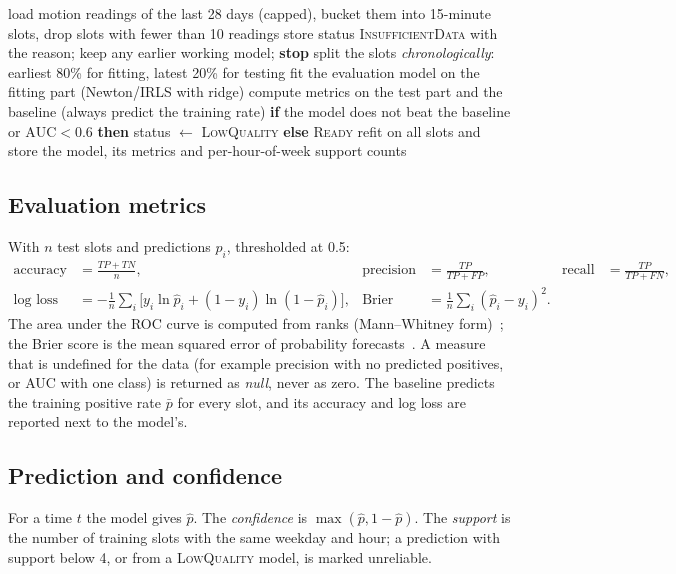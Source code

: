 \documentclass[12pt,a4paper,oneside]{report}
\begin{document}
\begin{algorithm}[H]
\caption{Occupancy training run}
\label{alg:train}
\begin{algorithmic}[1]
\State load motion readings of the last 28 days (capped), bucket them into 15-minute slots, drop slots with fewer than 10 readings
  \State store status \textsc{InsufficientData} with the reason; keep any earlier working model; \textbf{stop}
\EndIf
\State split the slots \emph{chronologically}: earliest 80\% for fitting, latest 20\% for testing
\State fit the evaluation model on the fitting part (Newton/IRLS with ridge)
\State compute metrics on the test part and the baseline (always predict the training rate)
\State \textbf{if} the model does not beat the baseline or $\mathrm{AUC}<0.6$ \textbf{then} status $\leftarrow$ \textsc{LowQuality} \textbf{else} \textsc{Ready}
\State refit on all slots and store the model, its metrics and per-hour-of-week support counts
\end{algorithmic}
\end{algorithm}

\subsection{Evaluation metrics}
With $n$ test slots and predictions $\hat p_i$, thresholded at 0.5:
\begin{align}
  \text{accuracy}&=\frac{TP+TN}{n}, &
  \text{precision}&=\frac{TP}{TP+FP}, &
  \text{recall}&=\frac{TP}{TP+FN},\\
  \text{log loss}&=-\frac1n\sum_i\big[y_i\ln\hat p_i+(1-y_i)\ln(1-\hat p_i)\big], &
  \text{Brier}&=\frac1n\sum_i(\hat p_i-y_i)^2 .
\end{align}
The area under the ROC curve is computed from ranks (Mann--Whitney form)~\cite{fawcett2006roc}; the Brier score is the mean squared error of probability forecasts~\cite{brier1950}. A measure that is undefined for the data (for example precision with no predicted positives, or AUC with one class) is returned as \emph{null}, never as zero. The baseline predicts the training positive rate $\bar p$ for every slot, and its accuracy and log loss are reported next to the model's.

\subsection{Prediction and confidence}
For a time $t$ the model gives $\hat p$. The \emph{confidence} is $\max(\hat p,1-\hat p)$. The \emph{support} is the number of training slots with the same weekday and hour; a prediction with support below 4, or from a \textsc{LowQuality} model, is marked unreliable.
\end{document}
